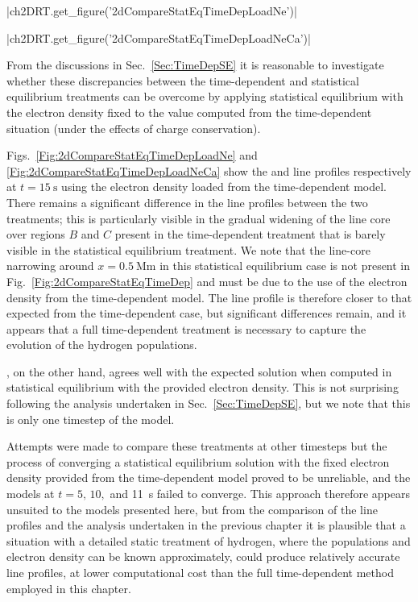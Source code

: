 \py[2DRT]|ch2DRT.get_figure('2dCompareStatEqTimeDepLoadNe')|

\py[2DRT]|ch2DRT.get_figure('2dCompareStatEqTimeDepLoadNeCa')|

From the discussions in Sec.~\ref{Sec:TimeDepSE} it is reasonable to investigate whether these discrepancies between the time-dependent and statistical equilibrium treatments can be overcome by applying statistical equilibrium with the electron density fixed to the value computed from the time-dependent situation (under the effects of charge conservation).

Figs.~\ref{Fig:2dCompareStatEqTimeDepLoadNe} and \ref{Fig:2dCompareStatEqTimeDepLoadNeCa} show the \Ha{} and \CaLine{} line profiles respectively at $t=\SI{15}{\second}$ using the electron density loaded from the time-dependent model.
There remains a significant difference in the \Ha{} line profiles between the two treatments; this is particularly visible in the gradual widening of the line core over regions $B$ and $C$ present in the time-dependent treatment that is barely visible in the statistical equilibrium treatment.
We note that the line-core narrowing around $x=\SI{0.5}{\mega\metre}$ in this statistical equilibrium case is not present in Fig.~\ref{Fig:2dCompareStatEqTimeDep} and must be due to the use of the electron density from the time-dependent model.
The \Ha{} line profile is therefore closer to that expected from the time-dependent case, but significant differences remain, and it appears that a full time-dependent treatment is necessary to capture the evolution of the hydrogen populations.

\CaLine{}, on the other hand, agrees well with the expected solution when computed in statistical equilibrium with the provided electron density.
This is not surprising following the analysis undertaken in Sec.~\ref{Sec:TimeDepSE}, but we note that this is only one timestep of the model.

Attempts were made to compare these treatments at other timesteps but the process of converging a statistical equilibrium solution with the fixed electron density provided from the time-dependent model proved to be unreliable, and the models at $t=5,\,10,$ and \SI{11}{\second} failed to converge.
This approach therefore appears unsuited to the models presented here, but from the comparison of the \CaLine{} line profiles and the analysis undertaken in the previous chapter it is plausible that a situation with a detailed static treatment of hydrogen, where the populations and electron density can be known approximately, could produce relatively accurate \CaLine{} line profiles, at lower computational cost than the full time-dependent method employed in this chapter.

